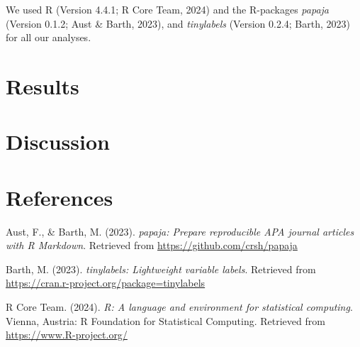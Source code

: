 \documentclass[
  man]{apa6}
\newlength{\cslhangindent}
\newenvironment{CSLReferences}[2] %
 {\begin{list}{}{%
  \setlength{\itemindent}{0pt}
  \setlength{\leftmargin}{0pt}
  \setlength{\parsep}{0pt}
  \ifodd #1
   \setlength{\leftmargin}{\cslhangindent}
   \setlength{\itemindent}{-1\cslhangindent}
  \fi
  \setlength{\itemsep}{#2\baselineskip}}}
 {\end{list}}
\begin{document}
We used R (Version 4.4.1; R Core Team, 2024) and the R-packages \emph{papaja} (Version 0.1.2; Aust \& Barth, 2023), and \emph{tinylabels} (Version 0.2.4; Barth, 2023) for all our analyses.

\section{Results}\label{results}

\section{Discussion}\label{discussion}

\newpage

\section{References}\label{references}

\label{refs}
\begin{CSLReferences}{1}{0}
Aust, F., \& Barth, M. (2023). \emph{{papaja}: {Prepare} reproducible {APA} journal articles with {R Markdown}}. Retrieved from \url{https://github.com/crsh/papaja}

Barth, M. (2023). \emph{{tinylabels}: Lightweight variable labels}. Retrieved from \url{https://cran.r-project.org/package=tinylabels}

R Core Team. (2024). \emph{R: A language and environment for statistical computing}. Vienna, Austria: R Foundation for Statistical Computing. Retrieved from \url{https://www.R-project.org/}

\end{CSLReferences}
\end{document}
